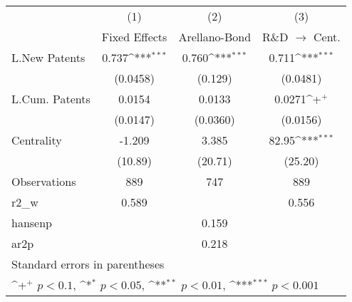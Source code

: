 {
\def\sym#1{\ifmmode^{#1}\else\(^{#1}\)\fi}
\begin{tabular}{l*{3}{c}}
\hline\hline
                    &\multicolumn{1}{c}{(1)}&\multicolumn{1}{c}{(2)}&\multicolumn{1}{c}{(3)}\\
                    &\multicolumn{1}{c}{Fixed Effects}&\multicolumn{1}{c}{Arellano-Bond}&\multicolumn{1}{c}{R\&D $\rightarrow$ Cent.}\\
\hline
L.New Patents       &       0.737\sym{***}&       0.760\sym{***}&       0.711\sym{***}\\
                    &    (0.0458)         &     (0.129)         &    (0.0481)         \\
L.Cum. Patents      &      0.0154         &      0.0133         &      0.0271\sym{+}  \\
                    &    (0.0147)         &    (0.0360)         &    (0.0156)         \\
Centrality          &      -1.209         &       3.385         &       82.95\sym{***}\\
                    &     (10.89)         &     (20.71)         &     (25.20)         \\
\hline
Observations        &         889         &         747         &         889         \\
r2\_w                &       0.589         &                     &       0.556         \\
hansenp             &                     &       0.159         &                     \\
ar2p                &                     &       0.218         &                     \\
\hline\hline
\multicolumn{4}{l}{\footnotesize Standard errors in parentheses}\\
\multicolumn{4}{l}{\footnotesize \sym{+} \(p<0.1\), \sym{*} \(p<0.05\), \sym{**} \(p<0.01\), \sym{***} \(p<0.001\)}\\
\end{tabular}
}
